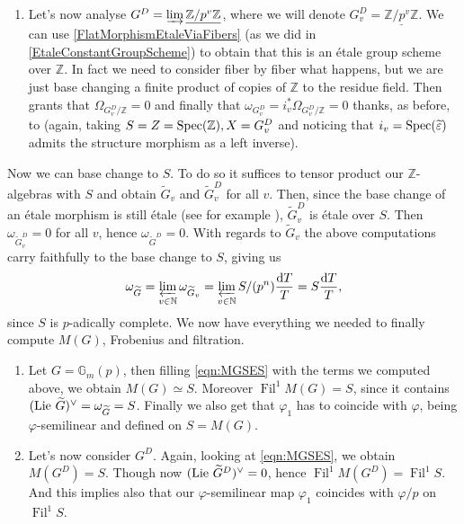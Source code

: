 \begin{ex}[]
\begin{enumerate}
	\item Let's now analyse $G^D = \varinjlim \underline{\mathbb{Z}/p^v\mathbb{Z}}$, where
		we will denote $G_v^D = \underline{\mathbb{Z}/p^v\mathbb{Z}}$.
		We can use \cref{FlatMorphismEtaleViaFibers} (as we did in
		\cref{EtaleConstantGroupScheme}) to obtain that this is an étale
		group scheme over $\mathbb{Z}$.
		In fact we need to consider fiber by fiber what happens, but we are
		just base changing a finite product of copies of $\mathbb{Z}$ to the
		residue field.
		Then \cite[\href{https://stacks.math.columbia.edu/tag/00U0}{Section 00U0}]{SP}
		grants that $\Omega_{G_v^D/\mathbb{Z}} = 0$
		and finally that $\omega_{G_v^D} = i^*_v \Omega_{G^D_v/\mathbb{Z}} = 0$ thanks,
		as before, to
		\cite[\href{https://stacks.math.columbia.edu/tag/0474}{Lemma 0474}]{SP}
		(again, taking $S = Z = \operatorname{Spec}(\mathbb{Z}), X = G_v^D$
		and noticing that $i_v = \operatorname{Spec}(\widetilde{\varepsilon})$ admits the structure morphism
		as a left inverse).
\end{enumerate}
	Now we can base change to $S$.
	To do so it suffices to tensor product our $\mathbb{Z}$-algebras
	with $S$ and obtain $\widetilde{G}_v$ and $\widetilde{G}_v^D$ for all $v$.
	Then, since the base change of an étale morphism is still étale (see for example
	\cite[\href{https://stacks.math.columbia.edu/tag/02GO}{Lemma 02GO}]{SP}),
	$\widetilde{G}_v^D$ is étale over $S$.
	Then $\omega_{\widetilde{G}_v^D} = 0$ for all $v$,
	hence $\omega_{\widetilde{G}^D} = 0$.
	With regards to $\widetilde{G}_v$ the above computations carry faithfully
	to the base change to $S$, giving us
	\begin{equation*}
	\omega_{\widetilde{G}} = \varprojlim_{v \in \mathbb{N}} \omega_{\widetilde{G}_v} =
	\varprojlim_{v \in \mathbb{N}} S/ (p^n) \frac{ \mathrm{d}T }{ T } = S \frac{ \mathrm{d}T }{ T }
	,\end{equation*}
	since $S$ is $p$-adically complete.
	We now have everything we needed to finally compute $M(G)$, Frobenius and filtration.
\begin{enumerate}
	\item Let $G = \mathbb{G}_m(p)$, then filling \cref{eqn:MGSES} with
		the terms we computed above, we obtain $M(G) \simeq S$.
		Moreover $\operatorname{Fil}^1 M(G) = S$, since it contains
		$(\operatorname{Lie}\, \widetilde{G})^\vee = \omega_{\widetilde{G}} = S$.
		Finally we also get that $\varphi_1$ has to coincide with $\varphi$,
		being $\varphi$-semilinear and defined on $S = M(G)$.

	\item Let's now consider $G^D$.
		Again, looking at \cref{eqn:MGSES}, we obtain $M(G^D) = S$.
		Though now $(\operatorname{Lie}\, \widetilde{G}^D)^\vee = 0$,
		hence $\operatorname{Fil}^1 M(G^D) = \operatorname{Fil}^1 S$.
		And this implies also that our $\varphi$-semilinear map
		$\varphi_1$ coincides with $\varphi/p$ on $\operatorname{Fil}^1S$.
\end{enumerate}
\end{ex}
